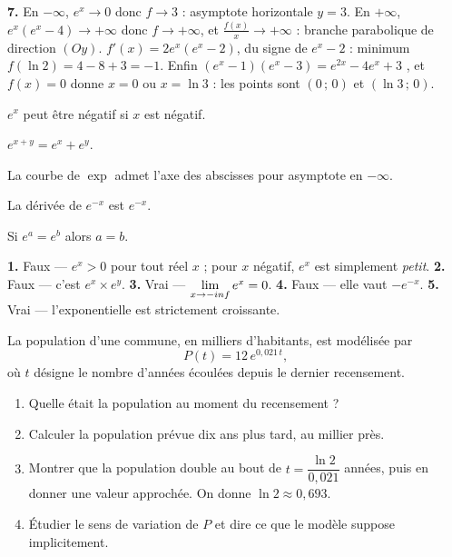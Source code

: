\begin{corrige}[annales]
\textbf{7.} En $-\infty$, $e^{x} \to 0$ donc $f \to 3$ : asymptote
horizontale $y = 3$. En $+\infty$, $e^{x}\left(e^{x}-4\right) \to +\infty$
donc $f \to +\infty$, et $\frac{f(x)}{x} \to +\infty$ : branche parabolique
de direction $(Oy)$. $f'(x) = 2e^{x}\left(e^{x}-2\right)$, du signe de
$e^{x}-2$ : minimum $f(\ln2) = 4-8+3 = -1$. Enfin
$\left(e^{x}-1\right)\left(e^{x}-3\right) = e^{2x}-4e^{x}+3$ \checkmark, et
$f(x) = 0$ donne $x = 0$ ou $x = \ln3$ : les points sont $(0\,;\,0)$ et
$(\ln3\,;\,0)$.
\end{corrige}

\begin{vraifaux}
\exo $e^{x}$ peut être négatif si $x$ est négatif.

\exo $e^{x+y} = e^{x}+e^{y}$.

\exo La courbe de $\exp$ admet l'axe des abscisses pour asymptote en
$-\infty$.

\exo La dérivée de $e^{-x}$ est $e^{-x}$.

\exo Si $e^{a} = e^{b}$ alors $a = b$.
\end{vraifaux}

\begin{corrige}
\textbf{1.} Faux — $e^{x}>0$ pour tout réel $x$ ; pour $x$ négatif, $e^{x}$
est simplement \emph{petit}.
\textbf{2.} Faux — c'est $e^{x}\times e^{y}$.
\textbf{3.} Vrai — $\limminf e^{x} = 0$.
\textbf{4.} Faux — elle vaut $-e^{-x}$.
\textbf{5.} Vrai — l'exponentielle est strictement croissante.
\end{corrige}

\begin{situation}
La population d'une commune, en milliers d'habitants,
est modélisée par
\[
  P(t) = 12\,e^{0{,}021\,t},
\]
où $t$ désigne le nombre d'années écoulées depuis le dernier recensement.

\begin{enumerate}[label=\textbf{\arabic*.}, leftmargin=*, itemsep=0.3em]
  \item Quelle était la population au moment du recensement ?
  \item Calculer la population prévue dix ans plus tard, au millier près.
  \item Montrer que la population double au bout de
        $t = \dfrac{\ln 2}{0{,}021}$ années, puis en donner une valeur
        approchée. On donne $\ln 2 \approx 0{,}693$.
  \item Étudier le sens de variation de $P$ et dire ce que le modèle suppose
        implicitement.
\end{enumerate}
\end{situation}

